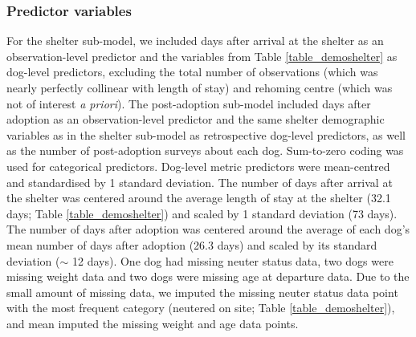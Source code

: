 \documentclass[12pt]{article}
\begin{document}
\subsubsection{Predictor variables}
For the shelter sub-model, we included days after arrival at the shelter as an observation-level predictor and the variables from Table \ref{table_demoshelter} as dog-level predictors, excluding the total number of observations (which was nearly perfectly collinear with length of stay) and rehoming centre (which was not of interest \textit{a priori}). The post-adoption sub-model included days after adoption as an observation-level predictor and the same shelter demographic variables as in the shelter sub-model as retrospective dog-level predictors, as well as the number of post-adoption surveys about each dog. Sum-to-zero coding was used for categorical predictors. Dog-level metric predictors were mean-centred and standardised by 1 standard deviation. The number of days after arrival at the shelter was centered around the average length of stay at the shelter (32.1 days; Table \ref{table_demoshelter}) and scaled by 1 standard deviation (73 days). The number of days after adoption was centered around the average of each dog's mean number of days after adoption (26.3 days) and scaled by its standard deviation ($\sim$ 12 days). One dog had missing neuter status data, two dogs were missing weight data and two dogs were missing age at departure data. Due to the small amount of missing data, we imputed the missing neuter status data point with the most frequent category (neutered on site; Table \ref{table_demoshelter}), and mean imputed the missing weight and age data points.
\end{document}

